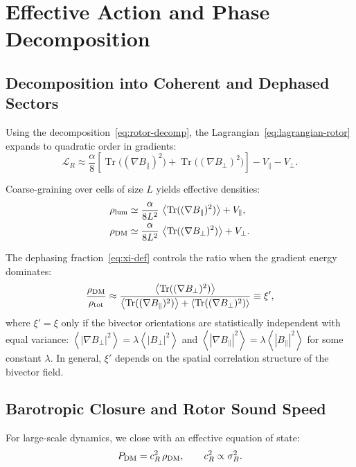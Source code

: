 \documentclass[11pt,a4paper]{article}
\numberwithin{equation}{section}
\theoremstyle{plain}
\theoremstyle{definition}
\theoremstyle{remark}
\DeclareMathOperator{\Tr}{Tr}
\newcommand{\avg}[1]{\left\langle #1 \right\rangle}
\newcommand{\Lag}{\mathcal{L}}              %
\begin{document}
\vspace{1em}

\section{Effective Action and Phase Decomposition}\label{sec:action}

\subsection{Decomposition into Coherent and Dephased Sectors}

Using the decomposition~\eqref{eq:rotor-decomp}, the Lagrangian~\eqref{eq:lagrangian-rotor} expands to quadratic order in gradients:
\begin{equation}
\Lag_R \approx \frac{\alpha}{8}\left[\Tr\big((\nabla B_\parallel)^2\big)+\Tr\big((\nabla B_\perp)^2\big)\right]-V_\parallel - V_\perp.
\end{equation}

Coarse-graining over cells of size $L$ yields effective densities:
\begin{align}
\rho_{\rm lum} &\simeq \frac{\alpha}{8L^2}\,\avg{\Tr((\nabla B_\parallel)^2)} + V_\parallel,
\label{eq:rho-lum}\\
\rho_{\rm DM} &\simeq \frac{\alpha}{8L^2}\,\avg{\Tr((\nabla B_\perp)^2)} + V_\perp.
\label{eq:rho-dm}
\end{align}

The dephasing fraction~\eqref{eq:xi-def} controls the ratio when the gradient energy dominates:
\begin{equation}
\frac{\rho_{\rm DM}}{\rho_{\rm tot}} \approx \frac{\avg{\Tr((\nabla B_\perp)^2)}}{\avg{\Tr((\nabla B_\parallel)^2)} + \avg{\Tr((\nabla B_\perp)^2)}} \equiv \xi',
\end{equation}
where $\xi' = \xi$ only if the bivector orientations are statistically independent with equal variance: $\avg{|\nabla B_\perp|^2} = \lambda \avg{|B_\perp|^2}$ and $\avg{|\nabla B_\parallel|^2} = \lambda \avg{|B_\parallel|^2}$ for some constant $\lambda$. In general, $\xi'$ depends on the spatial correlation structure of the bivector field.

\subsection{Barotropic Closure and Rotor Sound Speed}

For large-scale dynamics, we close with an effective equation of state:
\begin{equation}
P_{\rm DM}=c_R^2\,\rho_{\rm DM},\qquad c_R^2\propto \sigma_B^2.
\label{eq:eos-dm}
\end{equation}
\end{document}
